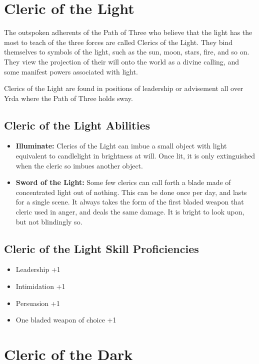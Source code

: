 \begin{multicols}{2}
\section{Cleric of the Light}

The outspoken adherents of the Path of Three who believe that the
light has the most to teach of the three forces are called Clerics
of the Light. They bind themselves to symbols of the light, such as
the sun, moon, stars, fire, and so on. They view the projection of
their will onto the world as a divine calling, and some manifest
powers associated with light.

Clerics of the Light are found in positions of leadership or advisement
all over Yrda where the Path of Three holds sway.

\subsection{Cleric of the Light Abilities}

\begin{itemize}
    \item \textbf{Illuminate:} Clerics of the Light can imbue a small object
    with light equivalent to candlelight in brightness at will. Once lit,
    it is only extinguished when the cleric so imbues another object.
    \item \textbf{Sword of the Light:} Some few clerics can call forth a
    blade made of concentrated light out of nothing. This can be done once
    per day, and lasts for a single scene. It always takes the form of the
    first bladed weapon that cleric used in anger, and deals the same damage.
    It is bright to look upon, but not blindingly so.
\end{itemize}

\subsection{Cleric of the Light Skill Proficiencies}

\begin{itemize}
    \item Leadership +1
    \item Intimidation +1
    \item Persuasion +1
    \item One bladed weapon of choice +1
\end{itemize}

\section{Cleric of the Dark}


\end{multicols}

